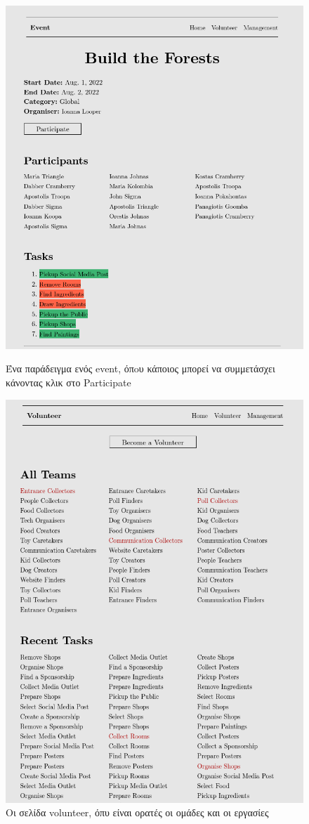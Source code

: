 \documentclass[manuscript,screen,review]{acmart}
\newcommand{\en}[1]{\foreignlanguage{english}{#1}}
\begin{document}
\begin{figure}[H]
 \centering
 \centering
    \includegraphics[width=.5\textwidth]{./images/eventparticipation.png}
    \caption{Ένα παράδειγμα ενός \en{event}, όπoυ κάποιος μπορεί να συμμετάσχει κάνοντας κλικ στο \en{Participate}}
    \includegraphics[width=.5\textwidth]{./images/volunteerpage.png}
    \caption{Οι σελίδα \en{volunteer}, όπυ είναι ορατές οι ομάδες και οι εργασίες}
\end{figure}
\end{document}
